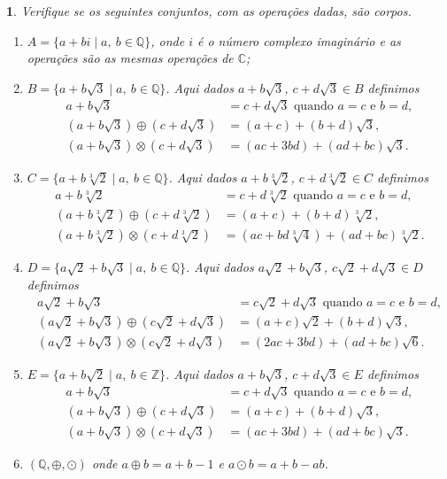 \documentclass[12pt]{exam}
\newtheorem{exercicio}{}
\newcommand{\z}{\mathbb{Z}}
\newcommand{\rac}{\mathbb{Q}}
\newcommand{\complex}{\mathbb{C}}
\begin{document}
\begin{exercicio}
Verifique se os seguintes conjuntos, com as opera\c{c}\~oes dadas, s\~ao corpos.
\begin{enumerate}[label={\alph*})]
    \item $A = \{ a + bi \mid a,\ b \in \rac\}$, onde $i$ \'e o n\'umero complexo imagin\'ario e as opera\c{c}\~oes s\~ao as mesmas opera\c{c}\~oes de $\complex$;
    \item $B = \{ a + b\sqrt{3} \mid a,\ b \in \rac\}$. Aqui dados $a + b\sqrt{3}$, $c + d\sqrt{3} \in B$ definimos
    \begin{align*}
      a + b\sqrt{3} &= c + d\sqrt{3} \mbox{ quando } a = c \mbox{ e } b = d,\\
      (a + b\sqrt{3}) \oplus (c + d\sqrt{3}) &= (a + c) + (b + d)\sqrt{3},\\
      (a + b\sqrt{3}) \otimes (c + d\sqrt{3}) &= (ac + 3bd) + (ad + bc)\sqrt{3}.
    \end{align*}
    \item $C = \{ a + b\sqrt[3]{2} \mid a,\ b \in \rac\}$. Aqui dados $a + b\sqrt[3]{2}$, $c + d\sqrt[3]{2} \in C$ definimos
    \begin{align*}
      a + b\sqrt[3]{2} &= c + d\sqrt[3]{2} \mbox{ quando } a = c \mbox{ e } b = d,\\
      (a + b\sqrt[3]{2}) \oplus (c + d\sqrt[3]{2}) &= (a + c) + (b + d)\sqrt[3]{2},\\
      (a + b\sqrt[3]{2}) \otimes (c + d\sqrt[3]{2}) &= (ac + bd\sqrt[3]{4}) + (ad + bc)\sqrt[3]{2}.
    \end{align*}
    \item $D = \{ a\sqrt{2} + b\sqrt{3} \mid a,\ b \in \rac\}$. Aqui dados $a\sqrt{2} + b\sqrt{3}$, $c\sqrt{2} + d\sqrt{3} \in D$ definimos
    \begin{align*}
      a\sqrt{2} + b\sqrt{3} &= c\sqrt{2} + d\sqrt{3} \mbox{ quando } a = c \mbox{ e } b = d,\\
      (a\sqrt{2} + b\sqrt{3}) \oplus (c\sqrt{2} + d\sqrt{3}) &= (a + c)\sqrt{2} + (b + d)\sqrt{3},\\
      (a\sqrt{2} + b\sqrt{3}) \otimes (c\sqrt{2} + d\sqrt{3}) &= (2ac + 3bd) + (ad + bc)\sqrt{6}.
    \end{align*}
    \item $E = \{ a + b\sqrt{2} \mid a,\ b \in \z\}$. Aqui dados $a + b\sqrt{3}$, $c + d\sqrt{3} \in E$ definimos
    \begin{align*}
      a + b\sqrt{3} &= c + d\sqrt{3} \mbox{ quando } a = c \mbox{ e } b = d,\\
      (a + b\sqrt{3}) \oplus (c + d\sqrt{3}) &= (a + c) + (b + d)\sqrt{3},\\
      (a + b\sqrt{3}) \otimes (c + d\sqrt{3}) &= (ac + 3bd) + (ad + bc)\sqrt{3}.
    \end{align*}
    \item $(\rac, \oplus, \odot)$ onde $a \oplus b = a + b - 1$ e $a \odot b = a + b - ab$.
  \end{enumerate}  
\end{exercicio}
\end{document}
